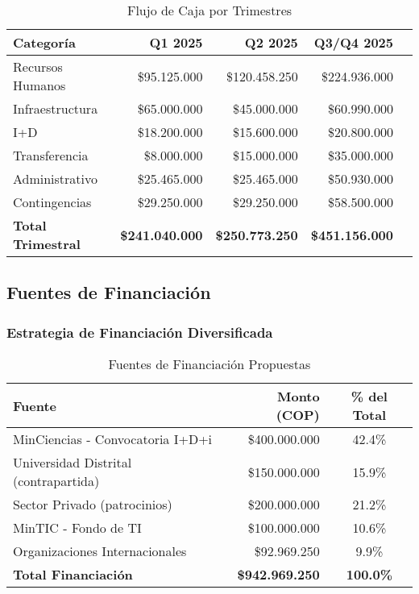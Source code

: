 \begin{table}[H]
    \centering
    \caption{Flujo de Caja por Trimestres}
    \label{tab:flujo_caja}
    \small
    \begin{tabular}{|l|r|r|r|r|}
        \hline
        \textbf{Categoría} & \textbf{Q1 2025} & \textbf{Q2 2025} & \textbf{Q3/Q4 2025} \\
        \hline
        Recursos Humanos & \$95.125.000 & \$120.458.250 & \$224.936.000 \\
        \hline
        Infraestructura & \$65.000.000 & \$45.000.000 & \$60.990.000 \\
        \hline
        I+D & \$18.200.000 & \$15.600.000 & \$20.800.000 \\
        \hline
        Transferencia & \$8.000.000 & \$15.000.000 & \$35.000.000 \\
        \hline
        Administrativo & \$25.465.000 & \$25.465.000 & \$50.930.000 \\
        \hline
        Contingencias & \$29.250.000 & \$29.250.000 & \$58.500.000 \\
        \hline
        \textbf{Total Trimestral} & \textbf{\$241.040.000} & \textbf{\$250.773.250} & \textbf{\$451.156.000} \\
        \hline
    \end{tabular}
\end{table}

\subsection{Fuentes de Financiación}

\subsubsection{Estrategia de Financiación Diversificada}

\begin{table}[H]
    \centering
    \caption{Fuentes de Financiación Propuestas}
    \label{tab:financiacion}
    \small
    \begin{tabular}{|l|r|c|}
        \hline
        \textbf{Fuente} & \textbf{Monto (COP)} & \textbf{\% del Total} \\
        \hline
        MinCiencias - Convocatoria I+D+i & \$400.000.000 & 42.4\% \\
        \hline
        Universidad Distrital (contrapartida) & \$150.000.000 & 15.9\% \\
        \hline
        Sector Privado (patrocinios) & \$200.000.000 & 21.2\% \\
        \hline
        MinTIC - Fondo de TI & \$100.000.000 & 10.6\% \\
        \hline
        Organizaciones Internacionales & \$92.969.250 & 9.9\% \\
        \hline
        \textbf{Total Financiación} & \textbf{\$942.969.250} & \textbf{100.0\%} \\
        \hline
    \end{tabular}
\end{table}

